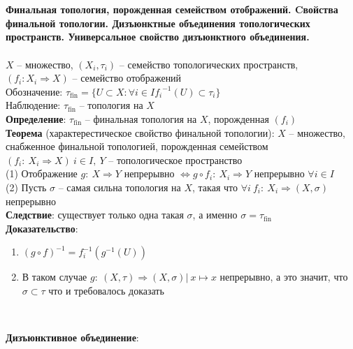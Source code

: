 \section{}
	\textbf{Финальная топология, порожденная семейством отображений. Cвойства финальной топологии. Дизъюнктные объединения топологических пространств. Универсальное свойство дизъюнктного объединения.}\\
	\\
	$X$ -- множество, $(X_i, {\tau}_i)$ -- семейство топологических пространств, $(f_i: X_i \Rightarrow X)$ -- семейство отображений\\
	Обозначение: ${\tau}_{\text{fin}} = \{U \subset X: \forall i \in I {f_i}^{-1} (U) \subset {\tau}_i \}$\\
	Наблюдение: ${\tau}_{\text{fin}}$ -- топология на $X$\\
	\textbf{Определение}: ${\tau}_{\text{fin}}$ -- финальная топология на $X$, порожденная $(f_i)$\\
	\textbf{Теорема} (характерестическое свойство финальной топологии): $X$ -- множество, снабженное финальной топологией, порожденная семейством $(f_i:\ X_i \Rightarrow X)\ i\in I,\ Y$ -- топологическое пространство\\
	(1) Отображение $g:\ X \Rightarrow Y$ непрерывно $\Leftrightarrow g \circ f_i:\ X_i \Rightarrow Y$ непрерывно $\forall i \in I$\\
	(2) Пусть $\sigma$ -- самая сильна топология на $X$, такая что $\forall i\ f_i:\ X_i \Rightarrow (X, \sigma)$ непрерывно\\
	\textbf{Следствие}: существует только одна такая $\sigma$, а именно $\sigma = {\tau}_{\text{fin}}$\\
	\textbf{Доказательство}: 
	\begin{enumerate}
		\item 
		$(g \circ f)^{-1} = f_i^{-1} (g^{-1}(U))$
		\begin{figure}[h]
		\end{figure}
		\item 
		В таком случае $g:\ (X, \tau) \Rightarrow (X, \sigma) |\ x\longmapsto x$ непрерывно, а это значит, что $\sigma \subset \tau$ что и требовалось доказать
		\begin{figure}[h]
		\end{figure}\\
	\end{enumerate}
	\textbf{Дизъюнктивное объединение}:\\
